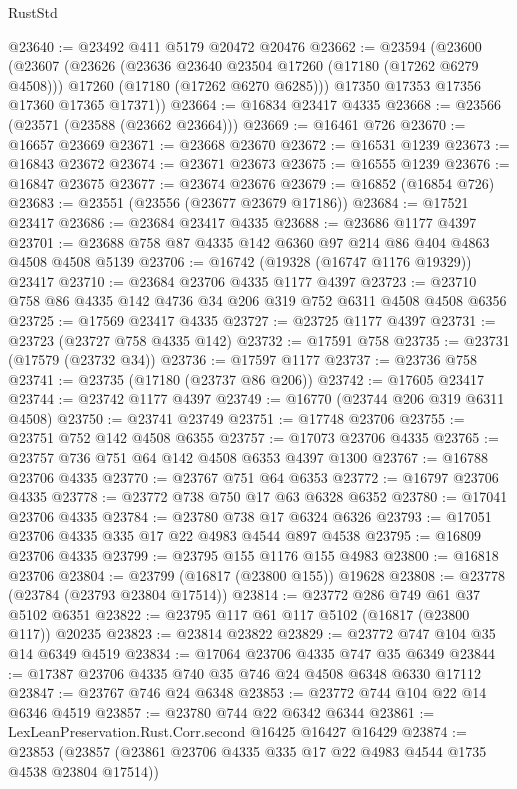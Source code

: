 \begin{lexlean}{RustStd}
\begin{coremodule}
{\begin{coremodule}
{{{{{{{{{{{{{{{{{{{{{{{{{{{{{{{{{{{{{{{{{{{{{{{{{{{{{{{@23640 := @23492 @411 @5179 @20472 @20476
@23662 := @23594
    (@23600
      (@23607
        (@23626
          (@23636 @23640 @23504 @17260 (@17180 (@17262 @6279 @4508)))
          @17260
          (@17180 (@17262 @6270 @6285)))
        @17350
        @17353
        @17356
        @17360
        @17365
        @17371))
@23664 := @16834 @23417 @4335
@23668 := @23566 (@23571 (@23588 (@23662 @23664)))
@23669 := @16461 @726
@23670 := @16657 @23669
@23671 := @23668 @23670
@23672 := @16531 @1239
@23673 := @16843 @23672
@23674 := @23671 @23673
@23675 := @16555 @1239
@23676 := @16847 @23675
@23677 := @23674 @23676
@23679 := @16852 (@16854 @726)
@23683 := @23551 (@23556 (@23677 @23679 @17186))
@23684 := @17521 @23417
@23686 := @23684 @23417 @4335
@23688 := @23686 @1177 @4397
@23701 := @23688 @758 @87 @4335 @142 @6360 @97 @214 @86 @404 @4863 @4508 @4508 @5139
@23706 := @16742 (@19328 (@16747 @1176 @19329)) @23417
@23710 := @23684 @23706 @4335 @1177 @4397
@23723 := @23710 @758 @86 @4335 @142 @4736 @34 @206 @319 @752 @6311 @4508 @4508 @6356
@23725 := @17569 @23417 @4335
@23727 := @23725 @1177 @4397
@23731 := @23723 (@23727 @758 @4335 @142)
@23732 := @17591 @758
@23735 := @23731 (@17579 (@23732 @34))
@23736 := @17597 @1177
@23737 := @23736 @758
@23741 := @23735 (@17180 (@23737 @86 @206))
@23742 := @17605 @23417
@23744 := @23742 @1177 @4397
@23749 := @16770 (@23744 @206 @319 @6311 @4508)
@23750 := @23741 @23749
@23751 := @17748 @23706
@23755 := @23751 @752 @142 @4508 @6355
@23757 := @17073 @23706 @4335
@23765 := @23757 @736 @751 @64 @142 @4508 @6353 @4397 @1300
@23767 := @16788 @23706 @4335
@23770 := @23767 @751 @64 @6353
@23772 := @16797 @23706 @4335
@23778 := @23772 @738 @750 @17 @63 @6328 @6352
@23780 := @17041 @23706 @4335
@23784 := @23780 @738 @17 @6324 @6326
@23793 := @17051 @23706 @4335 @335 @17 @22 @4983 @4544 @897 @4538
@23795 := @16809 @23706 @4335
@23799 := @23795 @155 @1176 @155 @4983
@23800 := @16818 @23706
@23804 := @23799 (@16817 (@23800 @155)) @19628
@23808 := @23778 (@23784 (@23793 @23804 @17514))
@23814 := @23772 @286 @749 @61 @37 @5102 @6351
@23822 := @23795 @117 @61 @117 @5102 (@16817 (@23800 @117)) @20235
@23823 := @23814 @23822
@23829 := @23772 @747 @104 @35 @14 @6349 @4519
@23834 := @17064 @23706 @4335 @747 @35 @6349
@23844 := @17387 @23706 @4335 @740 @35 @746 @24 @4508 @6348 @6330 @17112
@23847 := @23767 @746 @24 @6348
@23853 := @23772 @744 @104 @22 @14 @6346 @4519
@23857 := @23780 @744 @22 @6342 @6344
@23861 := LexLeanPreservation.Rust.Corr.second @16425 @16427 @16429
@23874 := @23853 (@23857 (@23861 @23706 @4335 @335 @17 @22 @4983 @4544 @1735 @4538 @23804 @17514))
}}}}}}}}}}}}}}}}}}}}}}}}}}}}}}}}}}}}}}}}}}}}}}}}}}}}}}}
\end{coremodule}}
\end{coremodule}
\end{lexlean}
